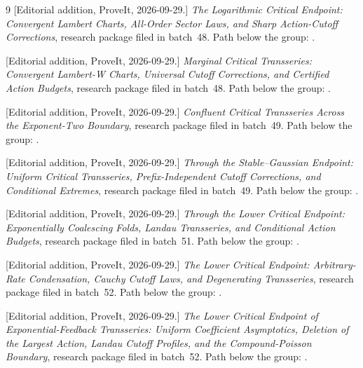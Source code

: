 \documentclass[11pt,a4paper]{article}
\numberwithin{equation}{section}
\theoremstyle{definition}
\theoremstyle{remark}
\begin{document}
\begin{thebibliography}{9}
[Editorial addition, ProveIt, 2026-09-29.]
\emph{The Logarithmic Critical Endpoint: Convergent Lambert Charts,
All-Order Sector Laws, and Sharp Action-Cutoff Corrections}, research
package filed in batch~48. Path below the group:
.

[Editorial addition, ProveIt, 2026-09-29.]
\emph{Marginal Critical Transseries: Convergent Lambert-W Charts, Universal
Cutoff Corrections, and Certified Action Budgets}, research package filed in
batch~48. Path below the group:
.

[Editorial addition, ProveIt, 2026-09-29.]
\emph{Confluent Critical Transseries Across the Exponent-Two Boundary},
research package filed in batch~49. Path below the group:
.

[Editorial addition, ProveIt, 2026-09-29.]
\emph{Through the Stable--Gaussian Endpoint: Uniform Critical Transseries,
Prefix-Independent Cutoff Corrections, and Conditional Extremes}, research
package filed in batch~49. Path below the group:
.

[Editorial addition, ProveIt, 2026-09-29.]
\emph{Through the Lower Critical Endpoint: Exponentially Coalescing Folds,
Landau Transseries, and Conditional Action Budgets}, research package filed
in batch~51. Path below the group:
.

[Editorial addition, ProveIt, 2026-09-29.]
\emph{The Lower Critical Endpoint: Arbitrary-Rate Condensation, Cauchy
Cutoff Laws, and Degenerating Transseries}, research package filed in
batch~52. Path below the group:
.

[Editorial addition, ProveIt, 2026-09-29.]
\emph{The Lower Critical Endpoint of Exponential-Feedback Transseries:
Uniform Coefficient Asymptotics, Deletion of the Largest Action, Landau
Cutoff Profiles, and the Compound-Poisson Boundary}, research package filed
in batch~52. Path below the group:
.

\end{thebibliography}
\endgroup
\end{document}
